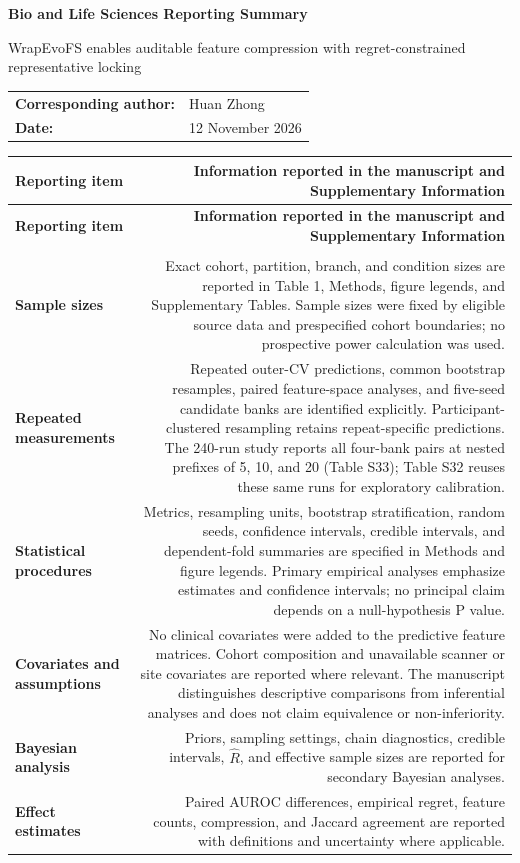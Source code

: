 \documentclass[10pt,letterpaper]{article}
\newcommand{\sectionrow}[1]{%
  \rowcolor{BandGray}\multicolumn{2}{l}{\sffamily\bfseries\color{TextGray}#1}\\[1pt]
}
\newcommand{\topic}[1]{\sffamily\bfseries\color{TextGray}#1}
\begin{document}
{\sffamily\bfseries\LARGE Bio and Life Sciences Reporting Summary}\par
\vspace{4pt}
{\large WrapEvoFS enables auditable feature compression with regret-constrained representative locking}\par
\vspace{7pt}
\begin{tabular}{@{}ll@{}}
\sffamily\bfseries Corresponding author: & Huan Zhong\\
\sffamily\bfseries Date: & 12 November 2026
\end{tabular}
\vspace{8pt}

\begin{longtable}{@{}LR@{}}
\toprule
\sffamily\bfseries Reporting item & \sffamily\bfseries Information reported in the manuscript and Supplementary Information\\
\midrule
\endfirsthead
\toprule
\sffamily\bfseries Reporting item & \sffamily\bfseries Information reported in the manuscript and Supplementary Information\\
\midrule
\endhead

\sectionrow{Statistics and reproducibility}
\topic{Sample sizes} & Exact cohort, partition, branch, and condition sizes are reported in Table 1, Methods, figure legends, and Supplementary Tables. Sample sizes were fixed by eligible source data and prespecified cohort boundaries; no prospective power calculation was used.\\
\topic{Repeated measurements} & Repeated outer-CV predictions, common bootstrap resamples, paired feature-space analyses, and five-seed candidate banks are identified explicitly. Participant-clustered resampling retains repeat-specific predictions. The 240-run study reports all four-bank pairs at nested prefixes of 5, 10, and 20 (Table S33); Table S32 reuses these same runs for exploratory calibration.\\
\topic{Statistical procedures} & Metrics, resampling units, bootstrap stratification, random seeds, confidence intervals, credible intervals, and dependent-fold summaries are specified in Methods and figure legends. Primary empirical analyses emphasize estimates and confidence intervals; no principal claim depends on a null-hypothesis P value.\\
\topic{Covariates and assumptions} & No clinical covariates were added to the predictive feature matrices. Cohort composition and unavailable scanner or site covariates are reported where relevant. The manuscript distinguishes descriptive comparisons from inferential analyses and does not claim equivalence or non-inferiority.\\
\topic{Bayesian analysis} & Priors, sampling settings, chain diagnostics, credible intervals, $\hat{R}$, and effective sample sizes are reported for secondary Bayesian analyses.\\
\topic{Effect estimates} & Paired AUROC differences, empirical regret, feature counts, compression, and Jaccard agreement are reported with definitions and uncertainty where applicable.\\


\end{longtable}
\end{document}
